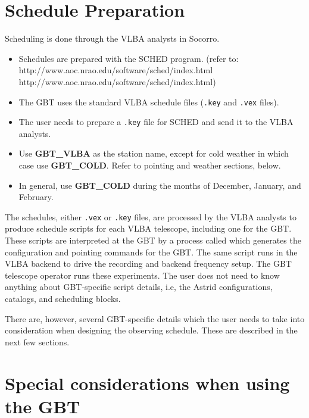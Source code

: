 \section{Schedule Preparation}
Scheduling is done through the \gls{VLBA} analysts in Socorro.  
\begin{itemize}
\item Schedules are prepared with the SCHED program.   \newline
(refer to: \htmladdnormallink
{http://www.aoc.nrao.edu/software/sched/index.html}
{http://www.aoc.nrao.edu/software/sched/index.html})

\item The \gls{GBT} uses the standard \gls{VLBA} schedule files
({\tt*.key} and {\tt*.vex} files).  
\item The user needs to prepare a {\tt.key} file for SCHED and send it
to the \gls{VLBA} analysts.

\item Use {\bf GBT\_VLBA} as the station name, except for cold weather
in which case use {\bf GBT\_COLD}. Refer to pointing and weather sections, below.  
\item In general, use {\bf GBT\_COLD} during the months of December, January,
and February.
\end{itemize}

The schedules, either {\tt.vex} or {\tt.key} files, are processed by the \gls{VLBA}
analysts to produce schedule scripts for each \gls{VLBA} telescope, including one
for the \gls{GBT}.  These scripts are interpreted at the \gls{GBT} by a process
called  which generates the configuration and pointing commands for
the \gls{GBT}. The same script runs in the \gls{VLBA} backend to drive the
recording and backend frequency setup.  The \gls{GBT} telescope operator runs these
experiments. The user does not need to know anything about GBT-specific script
details, i.e, the \gls{Astrid} configurations, catalogs, and scheduling blocks.

There are, however,  several GBT-specific details which the user needs to take
into consideration when designing the observing schedule.  These are described in
the next few sections.

\section{Special considerations when using the GBT}


